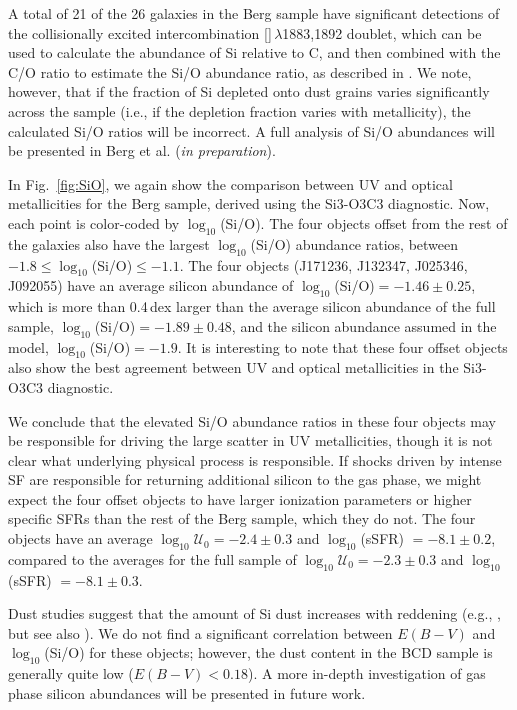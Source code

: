 \documentclass[preprint2]{aastex62}
\newcommand{\SiuIII}{[\ion{Si}{3}]}
\newcommand{\logten}{\ensuremath{\log_{10}}}
\newcommand{\logUeq}[1]{\ensuremath{\logten \mathcal{U}_0 = #1}}
\begin{document}
A total of 21 of the 26 galaxies in the Berg sample have significant detections of the collisionally excited intercombination \SiuIII$\,\lambda$1883,1892 doublet, which can be used to calculate the abundance of Si relative to C, and then combined with the C/O ratio to estimate the Si/O abundance ratio, as described in \citet{Berg+2018}. We note, however, that if the fraction of Si depleted onto dust grains varies significantly across the sample (i.e., if the depletion fraction varies with metallicity), the calculated Si/O ratios will be incorrect. A full analysis of Si/O abundances will be presented in Berg et al. (\emph{in preparation}).

In Fig.~\ref{fig:SiO}, we again show the comparison between UV and optical metallicities for the Berg sample, derived using the Si3-O3C3 diagnostic. Now, each point is color-coded by $\log_{10}$(Si/O). The four objects offset from the rest of the \citet{Berg+2016} galaxies also have the largest $\log_{10}$(Si/O) abundance ratios, between $-1.8 \leq \log_{10}$(Si/O)$ \leq-1.1$. The four objects (J171236, J132347, J025346, J092055) have an average silicon abundance of $\log_{10}$(Si/O)$=-1.46\pm0.25$, which is more than 0.4\,dex larger than the average silicon abundance of the full sample, $\log_{10}$(Si/O)$=-1.89\pm0.48$, and the silicon abundance assumed in the model, $\log_{10}$(Si/O)$=-1.9$. It is interesting to note that these four offset objects also show the best agreement between UV and optical metallicities in the Si3-O3C3 diagnostic.

We conclude that the elevated Si/O abundance ratios in these four objects may be responsible for driving the large scatter in UV metallicities, though it is not clear what underlying physical process is responsible. If shocks driven by intense SF are responsible for returning additional silicon to the gas phase, we might expect the four offset objects to have larger ionization parameters or higher specific SFRs than the rest of the Berg sample, which they do not. The four objects have an average $\logUeq{-2.4} \pm 0.3$ and \logten(sSFR) $=-8.1 \pm 0.2$, compared to the averages for the full sample of $\logUeq{-2.3} \pm 0.3$ and \logten(sSFR) $=-8.1 \pm 0.3$.

Dust studies suggest that the amount of Si dust increases with reddening (e.g., \citealt{Haris+2016}, but see also \citealt{Mishra+2017}). We do not find a significant correlation between $E(B-V)$ and $\log_{10}$(Si/O) for these objects; however, the dust content in the BCD sample is generally quite low ($E(B-V)<0.18$). A more in-depth investigation of gas phase silicon abundances will be presented in future work.
\end{document}
